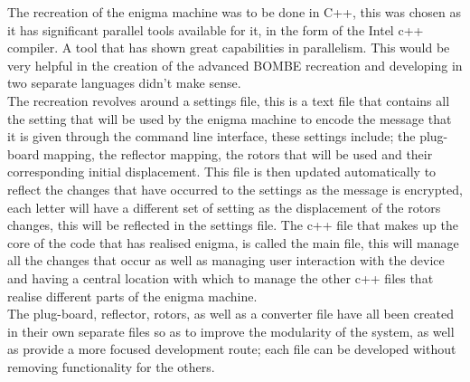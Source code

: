 \documentclass[12pt,a4paper]{article}
\begin{document}
The recreation of the enigma machine was to be done in C++, this was chosen as it has significant parallel tools available for it, in the form of the Intel c++ compiler. A tool that has shown great capabilities in parallelism. This would be very helpful in the creation of the advanced BOMBE recreation and developing in two separate languages didn't make sense.\\
The recreation revolves around a settings file, this is a text file that contains all the setting that will be used by the enigma machine to encode the message that it is given through the command line interface, these settings include; the plug-board mapping, the reflector mapping, the rotors that will be used and their corresponding initial displacement. This file is then updated automatically to reflect the changes that have occurred to the settings as the message is encrypted, each letter will have a different set of setting as the displacement of the rotors changes, this will be reflected in the settings file. The c++ file that makes up the core of the code that has realised enigma, is called the main file, this will manage all the changes that occur as well as managing user interaction with the device and having a central location with which to manage the other c++ files that realise different parts of the enigma machine.\\
The plug-board, reflector, rotors, as well as a converter file have all been created in their own separate files so as to improve the modularity of the system, as well as provide a more focused development route; each file can be developed without removing functionality for the others.\\
\end{document}
